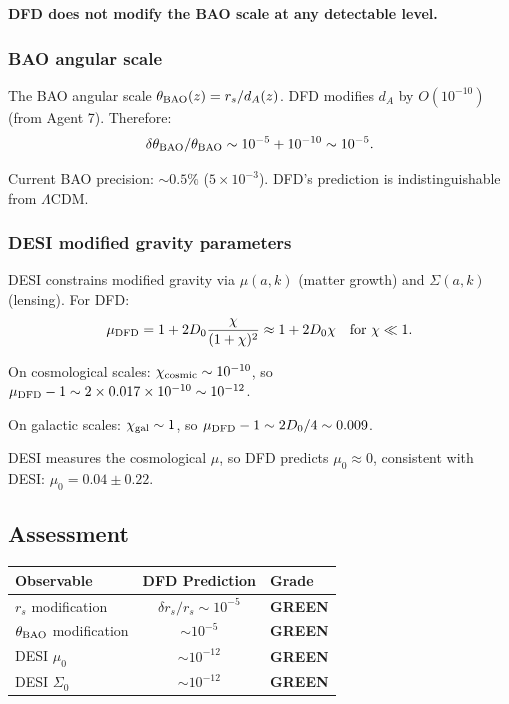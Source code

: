 \documentclass[11pt,a4paper]{article}
\newcommand{\GREEN}{\textcolor{dfdgreen}{\textbf{GREEN}}}
\begin{document}
\textbf{DFD does not modify the BAO scale at any detectable level.}

\subsubsection{BAO angular scale}

The BAO angular scale $\theta_{\rm BAO}(z) = r_s/d_A(z)$. DFD modifies $d_A$ by $O(10^{-10})$ (from Agent 7). Therefore:
\begin{equation}
\delta\theta_{\rm BAO}/\theta_{\rm BAO} \sim 10^{-5} + 10^{-10} \sim 10^{-5}.
\end{equation}

Current BAO precision: $\sim 0.5\%$ ($5 \times 10^{-3}$). DFD's prediction is indistinguishable from $\Lambda$CDM.

\subsubsection{DESI modified gravity parameters}

DESI constrains modified gravity via $\mu(a, k)$ (matter growth) and $\Sigma(a, k)$ (lensing). For DFD:
\begin{equation}
\mu_{\rm DFD} = 1 + 2D_0\frac{\chi}{(1+\chi)^2} \approx 1 + 2D_0\chi \quad \text{for } \chi \ll 1.
\end{equation}

On cosmological scales: $\chi_{\rm cosmic} \sim 10^{-10}$, so $\mu_{\rm DFD} - 1 \sim 2 \times 0.017 \times 10^{-10} \sim 10^{-12}$.

On galactic scales: $\chi_{\rm gal} \sim 1$, so $\mu_{\rm DFD} - 1 \sim 2D_0/4 \sim 0.009$.

DESI measures the cosmological $\mu$, so DFD predicts $\mu_0 \approx 0$, consistent with DESI: $\mu_0 = 0.04 \pm 0.22$.

\subsection{Assessment}

\begin{center}
\begin{tabular}{lcl}
\toprule
\textbf{Observable} & \textbf{DFD Prediction} & \textbf{Grade} \\
\midrule
$r_s$ modification & $\delta r_s/r_s \sim 10^{-5}$ & \GREEN \\
$\theta_{\rm BAO}$ modification & $\sim 10^{-5}$ & \GREEN \\
DESI $\mu_0$ & $\sim 10^{-12}$ & \GREEN \\
DESI $\Sigma_0$ & $\sim 10^{-12}$ & \GREEN \\
\bottomrule
\end{tabular}
\end{center}
\end{document}
